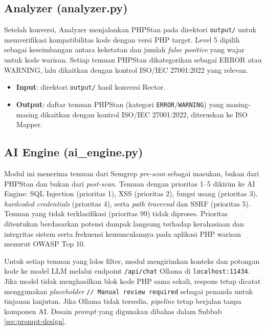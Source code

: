 \subsection{Analyzer (analyzer.py)}

Setelah konversi, Analyzer menjalankan PHPStan pada direktori \texttt{output/} untuk memverifikasi kompatibilitas kode dengan versi PHP target. Level 5 dipilih sebagai keseimbangan antara keketatan dan jumlah \textit{false positive} yang wajar untuk kode warisan. Setiap temuan PHPStan dikategorikan sebagai ERROR atau WARNING, lalu dikaitkan dengan kontrol ISO/IEC 27001:2022 yang relevan.

\begin{itemize}
    \item \textbf{Input}: direktori \texttt{output/} hasil konversi Rector.
    \item \textbf{Output}: daftar temuan PHPStan (kategori \texttt{ERROR}/\texttt{WARNING}) yang masing-masing dikaitkan dengan kontrol ISO/IEC 27001:2022, diteruskan ke ISO Mapper.
\end{itemize}


\subsection{AI Engine (ai\_engine.py)}

Modul ini menerima temuan dari Semgrep \textit{pre-scan} sebagai masukan, bukan dari PHPStan dan bukan dari \textit{post-scan}. 
Temuan dengan prioritas 1--5 dikirim ke AI Engine: SQL Injection (prioritas 1), XSS (prioritas 2), fungsi usang (prioritas 3), 
\textit{hardcoded credentials} (prioritas 4),
serta \textit{path traversal} dan SSRF (prioritas 5). Temuan yang tidak terklasifikasi (prioritas 99) 
tidak diproses. Prioritas ditentukan berdasarkan potensi dampak langsung 
terhadap kerahasiaan dan integritas sistem serta frekuensi kemunculannya pada aplikasi PHP warisan menurut OWASP Top 10. 

\begin{sloppypar}

Untuk setiap temuan yang lolos filter, modul mengirimkan konteks dan potongan kode ke model LLM melalui endpoint \texttt{/api/chat} Ollama di \texttt{localhost:11434}. Jika model tidak menghasilkan blok kode PHP sama sekali, respons tetap dicatat menggunakan \textit{placeholder} \texttt{// Manual review required} sebagai penanda untuk tinjauan lanjutan. Jika Ollama tidak tersedia, \textit{pipeline} tetap berjalan tanpa komponen AI. Desain \textit{prompt} yang digunakan dibahas dalam Subbab \ref{sec:prompt-design}.

\end{sloppypar}

